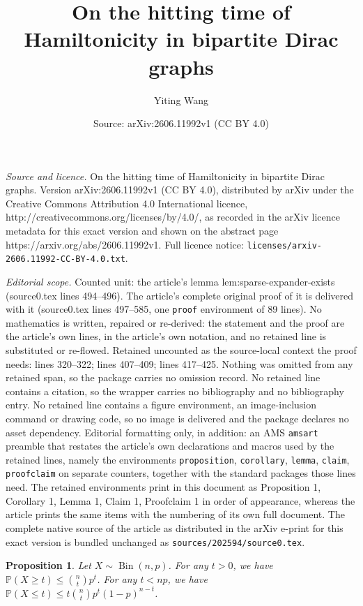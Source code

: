 \documentclass[10pt,a4paper]{amsart}
\title{On the hitting time of Hamiltonicity in bipartite Dirac graphs}
\author{Yiting Wang}
\date{Source: arXiv:2606.11992v1 (CC BY 4.0)}
\newtheorem{proposition}{Proposition}
\newcommand{\Bin}{\operatorname{Bin}}
\renewcommand{\Pr}{\mathbb{P}}
\begin{document}
\maketitle

\noindent\emph{Source and licence.} On the hitting time of Hamiltonicity in bipartite Dirac graphs. Version arXiv:2606.11992v1 (CC BY 4.0), distributed by arXiv under the Creative Commons Attribution 4.0 International licence, http://creativecommons.org/licenses/by/4.0/, as recorded in the arXiv licence metadata for this exact version and shown on the abstract page https://arxiv.org/abs/2606.11992v1. Full licence notice: \texttt{licenses/arxiv-2606.11992-CC-BY-4.0.txt}.\par\smallskip

\noindent\textit{Editorial scope.} Counted unit: the article's lemma lem:sparse-expander-exists (source0.tex lines 494--496). The article's complete original proof of it is delivered with it (source0.tex lines 497--585, one \texttt{proof} environment of 89 lines). No mathematics is written, repaired or re-derived: the statement and the proof are the article's own lines, in the article's own notation, and no retained line is substituted or re-flowed.  Retained uncounted as the source-local context the proof needs: lines 320--322; lines 407--409; lines 417--425.  Nothing was omitted from any retained span, so the package carries no omission record.  No retained line contains a citation, so the wrapper carries no bibliography and no bibliography entry.  No retained line contains a figure environment, an image-inclusion command or drawing code, so no image is delivered and the package declares no asset dependency.  Editorial formatting only, in addition: an AMS \texttt{amsart} preamble that restates the article's own declarations and macros used by the retained lines, namely the environments \texttt{proposition}, \texttt{corollary}, \texttt{lemma}, \texttt{claim}, \texttt{proofclaim} on separate counters, together with the standard packages those lines need.  The retained environments print in this document as Proposition 1, Corollary 1, Lemma 1, Claim 1, Proofclaim 1 in order of appearance, whereas the article prints the same items with the numbering of its own full document.  The complete native source of the article as distributed in the arXiv e-print for this exact version is bundled unchanged as \texttt{sources/202594/source0.tex}.
\begin{proposition}\label{prop:basic-inequality}
    Let $X\sim \Bin(n,p)$. For any $t > 0$, we have $\Pr(X\geq t)\leq \binom{n}{t}p^t$. For any $t< np$, we have $\Pr(X\leq t)\leq t\binom{n}{t}p^t(1-p)^{n-t}$.
\end{proposition}
\end{document}
